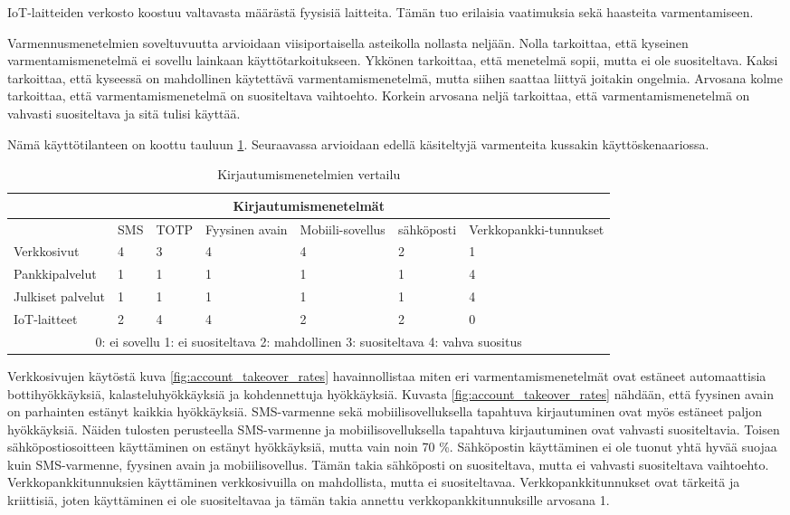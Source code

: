 IoT-laitteiden verkosto koostuu valtavasta määrästä fyysisiä laitteita. Tämän tuo erilaisia vaatimuksia sekä haasteita varmentamiseen.

Varmennusmenetelmien soveltuvuutta arvioidaan viisiportaisella asteikolla nollasta neljään. Nolla tarkoittaa, että kyseinen varmentamismenetelmä ei sovellu lainkaan käyttötarkoitukseen. Ykkönen tarkoittaa, että menetelmä sopii, mutta ei ole suositeltava. Kaksi tarkoittaa, että kyseessä on mahdollinen käytettävä varmentamismenetelmä, mutta siihen saattaa liittyä joitakin ongelmia. Arvosana kolme tarkoittaa, että varmentamismenetelmä on suositeltava vaihtoehto. Korkein arvosana neljä tarkoittaa, että varmentamismenetelmä on vahvasti suositeltava ja sitä tulisi käyttää.

Nämä käyttötilanteen on koottu tauluun \ref{tab:vertailu}. Seuraavassa arvioidaan edellä käsiteltyjä varmenteita kussakin käyttöskenaariossa.

\begin{table}[ht]
\begin{tabular}{ |p{3cm}|p{1cm}|p{}|p{}|p{}|p{2cm}|p{}|  }
 \hline
 \multicolumn{7}{|c|}{ Kirjautumismenetelmät} \\
 \hline
 & SMS & TOTP &Fyysinen avain & Mobiili-sovellus & sähköposti & Verkkopankki-tunnukset\\
 \hline
 Verkkosivut& 4 & 3 & 4 & 4 & 2 & 1\\
 Pankkipalvelut& 1 & 1 & 1 & 1 & 1 & 4\\
 Julkiset palvelut& 1 & 1 & 1 & 1 & 1 & 4\\
 IoT-laitteet& 2 & 4 & 4 & 2 & 2 & 0\\
 \hline
 \multicolumn{7}{|c|}{
0: ei sovellu
1: ei suositeltava
2: mahdollinen
3: suositeltava
4: vahva suositus} \\
\hline

\end{tabular}
\caption{\label{tab:vertailu} Kirjautumismenetelmien vertailu}
\end{table}

Verkkosivujen käytöstä kuva \ref{fig:account_takeover_rates} havainnollistaa miten eri varmentamismenetelmät ovat estäneet automaattisia bottihyökkäyksiä, kalasteluhyökkäyksiä ja kohdennettuja hyökkäyksiä. Kuvasta \ref{fig:account_takeover_rates} nähdään, että fyysinen avain on parhainten estänyt kaikkia hyökkäyksiä. SMS-varmenne sekä mobiilisovelluksella tapahtuva kirjautuminen ovat myös estäneet paljon hyökkäyksiä. Näiden tulosten perusteella SMS-varmenne ja mobiilisovelluksella tapahtuva kirjautuminen ovat vahvasti suositeltavia. Toisen sähköpostiosoitteen käyttäminen on estänyt hyökkäyksiä, mutta vain noin 70 \%. Sähköpostin käyttäminen ei ole tuonut yhtä hyvää suojaa kuin SMS-varmenne, fyysinen avain ja mobiilisovellus. Tämän takia sähköposti on suositeltava, mutta ei vahvasti suositeltava vaihtoehto. Verkkopankkitunnuksien käyttäminen verkkosivuilla on mahdollista, mutta ei suositeltavaa. Verkkopankkitunnukset ovat tärkeitä ja kriittisiä, joten käyttäminen ei ole suositeltavaa ja tämän takia annettu verkkopankkitunnuksille arvosana 1.

